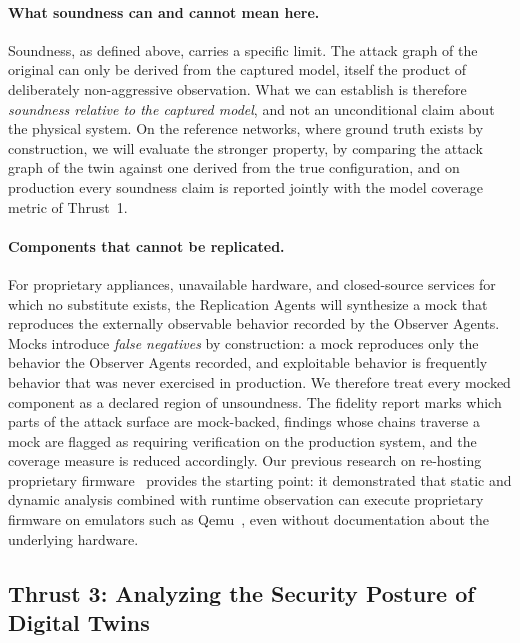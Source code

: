 \paragraph{What soundness can and cannot mean here.}
Soundness, as defined above, carries a specific limit. The attack
graph of the original can only be derived from the captured model, itself the
product of deliberately non-aggressive observation. What we can establish is therefore \emph{soundness relative to the captured
model}, and not an unconditional claim about the physical system. On the reference
networks, where ground truth exists by construction, we will evaluate the
stronger property, by comparing the attack graph of the twin against one
derived from the true configuration, and on production every soundness claim
is reported jointly with the model coverage metric of Thrust~1.

\paragraph{Components that cannot be replicated.}
For proprietary appliances, unavailable hardware, and closed-source services
for which no substitute exists, the Replication Agents will synthesize a mock
that reproduces the externally observable behavior recorded by the Observer
Agents. Mocks introduce \emph{false negatives} by construction: a mock reproduces only
the behavior the Observer Agents recorded, and exploitable behavior is
frequently behavior that was never exercised in production. We therefore treat every mocked
component as a declared region of unsoundness. The fidelity report marks
which parts of the attack surface are mock-backed, findings whose chains
traverse a mock are flagged as requiring verification on the production
system, and the coverage measure is reduced accordingly. Our previous
research on re-hosting proprietary
firmware~\cite{gustafson2019:pretender,gustafson2020:halucinator,spensky2021:Conware,scharnowski22:fuzzware}
provides the starting point: it demonstrated that static and dynamic analysis
combined with runtime observation can execute proprietary firmware on emulators
such as Qemu~\cite{qemu}, even without documentation about the underlying
hardware.

\subsection{Thrust 3: Analyzing the Security Posture of Digital Twins}
\label{sec:thrust3}

